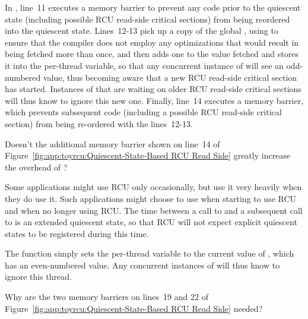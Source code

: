 In , line~11 executes a memory barrier
to prevent any code prior to the quiescent state (including possible
RCU read-side critical sections) from being reordered
into the quiescent state.
Lines~12-13 pick up a copy of the global , using
 to ensure that the compiler does not employ any
optimizations that would result in  being fetched
more than once,
and then adds one to the value fetched and stores it into
the per-thread  variable, so that any concurrent
instance of  will see an odd-numbered value,
thus becoming aware that a new RCU read-side critical section has started.
Instances of  that are waiting on older
RCU read-side critical sections will thus know to ignore this new one.
Finally, line~14 executes a memory barrier, which prevents subsequent
code (including a possible RCU read-side critical section) from being
re-ordered with the lines~12-13.

\QuickQuiz{}
	Doesn't the additional memory barrier shown on line~14 of
	Figure~\ref{fig:app:toyrcu:Quiescent-State-Based RCU Read Side}
	greatly increase the overhead of ?
 \QuickQuizEnd

Some applications might use RCU only occasionally, but use it very heavily
when they do use it.
Such applications might choose to use  when
starting to use RCU and  when no longer
using RCU.
The time between a call to  and a subsequent
call to  is an extended quiescent state,
so that RCU will not expect explicit quiescent states to be registered
during this time.

The  function simply sets the
per-thread  variable to the current value of
, which has an even-numbered value.
Any concurrent instances of  will thus know to
ignore this thread.

\QuickQuiz{}
	Why are the two memory barriers on lines~19 and 22 of
	Figure~\ref{fig:app:toyrcu:Quiescent-State-Based RCU Read Side}
	needed?
 \QuickQuizEnd

